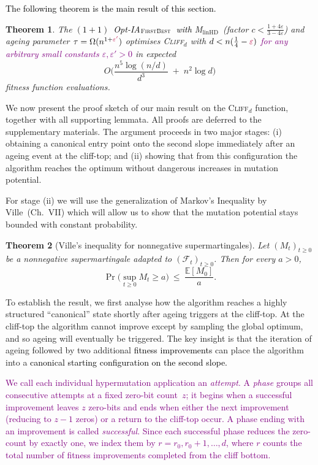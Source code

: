 \documentclass[lettersize,journal]{IEEEtran}
\newcommand{\rev}[1]{\textcolor{black}{#1}}
\newcommand{\rerev}[1]{\textcolor{purple}{#1}}
\newcommand{\EE}{\mathbb{E}}
\newcommand{\cliff}{\textsc{Cliff}$_d$}
\newcommand{\linHD}{M$_{\text{linHD}}$}
\newcommand{\firstBest}{$(1+1)$~Opt-IA$_{\textsc{FirstBest}}$}
\newtheorem{theorem}{Theorem}
\begin{document}
 
{
\rev{The following theorem is the main result of this section.}
\begin{theorem}\label{th:expoHD-cliff}
	The \textcolor{black}{\firstBest~with} \linHD\ (factor $c<\tfrac{1+4\varepsilon}{3-4\varepsilon}$) and ageing parameter $\tau=\Omega(n^{1+\rerev{\varepsilon'}})$
	optimises \cliff{} with $d<n(\tfrac{1}{4}-\rerev{\varepsilon})$ \rerev{for any arbitrary small constants $\varepsilon,\varepsilon'>0$} in expected
	\[
	O\!\Big(\frac{n^{5}\log(n/d)}{d^{3}} \;+\; n^{2}\log d\Big)
	\]
	fitness function evaluations.
\end{theorem}


We now present the proof sketch of our main result on the  \cliff{} function, together with 
all supporting lemmata.  All proofs are deferred to the supplementary materials. The argument proceeds in two 
major stages: (i) obtaining a canonical entry point onto the second slope 
immediately after an ageing event at the cliff-top; and (ii) showing that from 
this configuration the algorithm reaches the optimum without dangerous increases in mutation potential.

For stage (ii) we will use the generalization of Markov's Inequality by Ville~\cite{Doob1953}(Ch.~VII) which will allow us to show that the mutation potential stays bounded with constant probability.
\begin{theorem}[Ville's inequality for nonnegative supermartingales]\label{thm:ville}
	Let $(M_t)_{t\ge 0}$ be a nonnegative supermartingale adapted to $(\mathcal F_t)_{t\ge 0}$. 
	Then for every $a>0$,
	\[
	\Pr\!\big(\sup_{t\ge 0} M_t \ge a\big)\ \le\ \frac{\EE[M_0]}{a}.
	\]
\end{theorem}



To establish the result, we first analyse how the algorithm reaches a highly 
structured ``canonical'' state shortly after ageing triggers at the cliff-top.
At the cliff-top the algorithm cannot improve except by sampling the global 
optimum, and so ageing will eventually be triggered.  The key insight is that 
the iteration of ageing followed by two additional \textcolor{black}{fitness improvements} can place the 
algorithm into a
\textcolor{black}{canonical
starting configuration on the second slope.}

\rerev{We call each individual hypermutation application an \emph{attempt}.
A \emph{phase} groups all consecutive attempts at a fixed zero-bit count~$z$;
it begins when a successful improvement leaves $z$ zero-bits and ends when
either the next improvement (reducing to $z-1$ zeros) or a
 return to the cliff-top occur.
A phase ending with an improvement is called \emph{successful}.
Since each successful phase reduces the zero-count by exactly one, we
index them by $r = r_0, r_0+1, \dots, d$, where $r$ counts the total
number of fitness improvements completed from the cliff bottom.}

}
\end{document}

